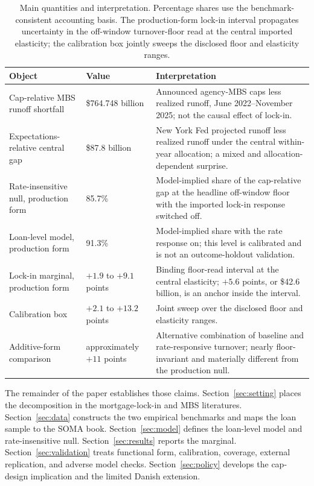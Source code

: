 \begin{table}[H]
\centering
\small
\caption{Main quantities and interpretation. Percentage shares use the benchmark-consistent accounting basis. The production-form lock-in interval propagates uncertainty in the off-window turnover-floor read at the central imported elasticity; the calibration box jointly sweeps the disclosed floor and elasticity ranges.}
\label{tab:mainresults}\label{tab:headline}
\begin{tabular}{@{}p{4.2cm}p{3.2cm}p{7.0cm}@{}}
\toprule
Object & Value & Interpretation \\
\midrule
Cap-relative MBS runoff shortfall & \$764.748 billion & Announced agency-MBS caps less realized runoff, June 2022--November 2025; not the causal effect of lock-in. \\
Expectations-relative central gap & \$87.8 billion & New York Fed projected runoff less realized runoff under the central within-year allocation; a mixed and allocation-dependent surprise. \\
Rate-insensitive null, production form & 85.7\% & Model-implied share of the cap-relative gap at the headline off-window floor with the imported lock-in response switched off. \\
Loan-level model, production form & 91.3\% & Model-implied share with the rate response on; this level is calibrated and is not an outcome-holdout validation. \\
Lock-in marginal, production form & $+1.9$ to $+9.1$ points & Binding floor-read interval at the central elasticity; $+5.6$ points, or \$42.6 billion, is an anchor inside the interval. \\
Calibration box & $+2.1$ to $+13.2$ points & Joint sweep over the disclosed floor and elasticity ranges. \\
Additive-form comparison & approximately $+11$ points & Alternative combination of baseline and rate-responsive turnover; nearly floor-invariant and materially different from the production null. \\
\bottomrule
\end{tabular}
\end{table}

The remainder of the paper establishes those claims. Section~\ref{sec:setting} places the decomposition in the mortgage-lock-in and MBS literatures. Section~\ref{sec:data} constructs the two empirical benchmarks and maps the loan sample to the SOMA book. Section~\ref{sec:model} defines the loan-level model and rate-insensitive null. Section~\ref{sec:results} reports the marginal. Section~\ref{sec:validation} treats functional form, calibration, coverage, external replication, and adverse model checks. Section~\ref{sec:policy} develops the cap-design implication and the limited Danish extension.

